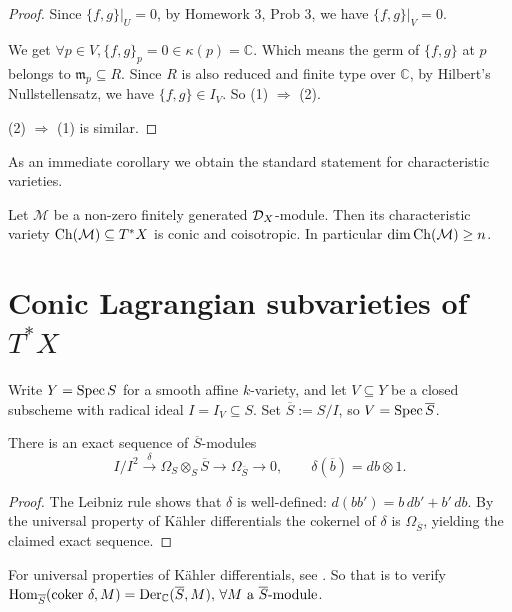 \begin{proof}
    Since $\{f, g\}|_U = 0$, by Homework 3, Prob 3, we have $\{f, g\}|_V = 0$.

    We get $\forall p\in V, \{f, g\}_p = 0 \in \kappa(p) = \mathbb{C}$. Which means the germ of $\{f, g\}$ at $p$ belongs to $\mathfrak{m}_p \subseteq R$. Since $R$ is also reduced and finite type over $\mathbb{C}$, by Hilbert's Nullstellensatz, we have $\{f, g\} \in I_V$. So (1) $\Rightarrow$ (2).

    (2) $\Rightarrow$ (1) is similar.
\end{proof}

As an immediate corollary we obtain the standard statement for characteristic
varieties.

\begin{theorem}\label{thm:Bernstein-inequality}
    Let $\mathcal M$ be a non-zero finitely generated $\mathcal{D}_X$-module.  Then its
    characteristic variety $\operatorname{Ch}(\mathcal M)\subseteq T^\ast X$ is conic and
    coisotropic.  In particular $\dim \operatorname{Ch}(\mathcal M)\ge n$.
\end{theorem}

\section{Conic Lagrangian subvarieties of $T^\ast X$}

Write $Y=\operatorname{Spec} S$ for a smooth affine $k$-variety, and let
$V\subseteq Y$ be a closed subscheme with radical ideal $I=I_V\subseteq S$.
Set $\overline S:=S/I$, so $V=\operatorname{Spec} \overline S$.

\begin{lemma}\label{lem:second_fundamental_exact_sequence}
    There is an exact sequence of $\overline S$-modules
    \[
        I/I^2 \xrightarrow{\;\delta\;} \Omega_S\otimes_S \overline S
        \longrightarrow \Omega_{\overline S}\longrightarrow 0,\qquad
        \delta(\overline b)=db\otimes 1.
    \]
\end{lemma}
\begin{proof}
    The Leibniz rule shows that $\delta$ is well-defined: $d(bb')=b\,db'+b'\,db$.
    By the universal property of Kähler differentials the cokernel of $\delta$ is
    $\Omega_{\overline S}$, yielding the claimed exact sequence.
\end{proof}

\begin{remark}
    For universal properties of Kähler differentials, see \cite[\href{https://stacks.math.columbia.edu/tag/00RO}{Tag 00RO}]{stacks-project}.
    So that is to verify $\operatorname{Hom}_{\overline{S}}(\text{coker }\delta, M) = \operatorname{Der}_{\mathbb{C}}(\overline{S}, M),\, \forall M \text{ a } \overline{S}\text{-module}$.
\end{remark}


